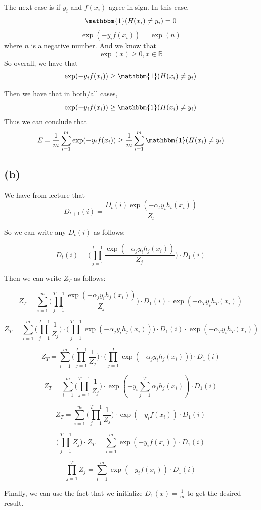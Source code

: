\documentclass{article}
\begin{document}
The next case is if $y_i$ and $f(x_i)$ agree in sign. In this case,
\[ \mathbbm{1} (H(x_i) \neq y_i) = 0 \]
\[ \exp(-y_i f(x_i)) = \exp(n) \]
where $n$ is a negative number. And we know that
\[ \exp(x) \geq 0, x \in \mathbb{R} \]
So overall, we have that
\[ \exp(-y_i f(x_i)) \geq \mathbbm{1} (H(x_i) \neq y_i) \]

Then we have that in both/all cases,
\[ \exp(-y_i f(x_i)) \geq \mathbbm{1} (H(x_i) \neq y_i) \]
Thus we can conclude that
\[ E = \frac{1}{m} \sum_{i = 1}^m \exp(-y_i f(x_i)) \geq \frac{1}{m} \sum_{i = 1}^m
    \mathbbm{1} (H(x_i) \neq y_i) \]

\subsection*{(b)}
We have from lecture that
\[ D_{t+1}(i) = \frac{D_t(i) \exp(-\alpha_t y_i h_t(x_i))}{Z_t} \]

So we can write any $D_t(i)$ as follows:

\[ D_t(i) = \Big( \prod_{j = 1}^{t - 1} \frac{\exp(-\alpha_j y_i h_j(x_i))}{Z_j} \Big)
    \cdot D_1(i) \]

Then we can write $Z_T$ as follows:

\[ Z_T = \sum_{i = 1}^m \Big( \prod_{j = 1}^{T - 1} \frac{\exp(-\alpha_j y_i h_j(x_i))}{Z_j} \Big)
    \cdot D_1(i) \cdot \exp(-\alpha_T y_i h_T(x_i)) \]

\[ Z_T = \sum_{i = 1}^m \Big( \prod_{j = 1}^{T - 1} \frac{1}{Z_j} \Big) \cdot
    \Big( \prod_{j = 1}^{T - 1} \exp(-\alpha_j y_i h_j(x_i)) \Big)
    \cdot D_1(i) \cdot \exp(-\alpha_T y_i h_T(x_i)) \]

\[ Z_T = \sum_{i = 1}^m \Big( \prod_{j = 1}^{T - 1} \frac{1}{Z_j} \Big) \cdot
    \Big( \prod_{j = 1}^{T} \exp(-\alpha_j y_i h_j(x_i)) \Big)
    \cdot D_1(i) \]

\[ Z_T = \sum_{i = 1}^m \Big( \prod_{j = 1}^{T - 1} \frac{1}{Z_j} \Big) \cdot
    \exp(-y_i \sum_{j = 1}^T \alpha_j h_j(x_i))
    \cdot D_1(i) \]

\[ Z_T = \sum_{i = 1}^m \Big( \prod_{j = 1}^{T - 1} \frac{1}{Z_j} \Big) \cdot
    \exp(-y_i f(x_i))
    \cdot D_1(i) \]

\[ \Big( \prod_{j = 1}^{T - 1} Z_j \Big) \cdot Z_T = \sum_{i = 1}^m
    \exp(-y_i f(x_i))
    \cdot D_1(i) \]

\[ \prod_{j = 1}^{T} Z_j = \sum_{i = 1}^m \exp(-y_i f(x_i)) \cdot D_1(i) \]

Finally, we can use the fact that we initialize $D_1(x) = \frac{1}{m}$ to
get the desired result.
\end{document}
